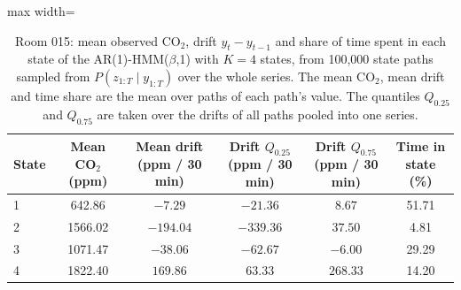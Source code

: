 \begin{table}[ht]
\centering
\begin{adjustbox}{max width=\textwidth}
\begin{tabular}{lccccc}
\hline
State & Mean CO$_2$ (ppm) & Mean drift (ppm / 30 min) & Drift $Q_{0.25}$ (ppm / 30 min) & Drift $Q_{0.75}$ (ppm / 30 min) & Time in state (\%) \\
\hline
1 & 642.86 & $-7.29$ & $-21.36$ & $8.67$ & 51.71 \\
2 & 1566.02 & $-194.04$ & $-339.36$ & $37.50$ & 4.81 \\
3 & 1071.47 & $-38.06$ & $-62.67$ & $-6.00$ & 29.29 \\
4 & 1822.40 & $169.86$ & $63.33$ & $268.33$ & 14.20 \\
\hline
\end{tabular}
\end{adjustbox}
\caption{Room 015: mean observed CO$_2$, drift $y_t - y_{t-1}$ and share of time spent in each state of the AR(1)-HMM($\beta$,1) with $K=4$ states, from 100{,}000 state paths sampled from $P(z_{1:T} \mid y_{1:T})$ over the whole series. The mean CO$_2$, mean drift and time share are the mean over paths of each path's value. The quantiles $Q_{0.25}$ and $Q_{0.75}$ are taken over the drifts of all paths pooled into one series.}
\label{tab:state_summary_room_015_calibrated_anchor_ar1_hmm_beta_1_K4}
\end{table}
